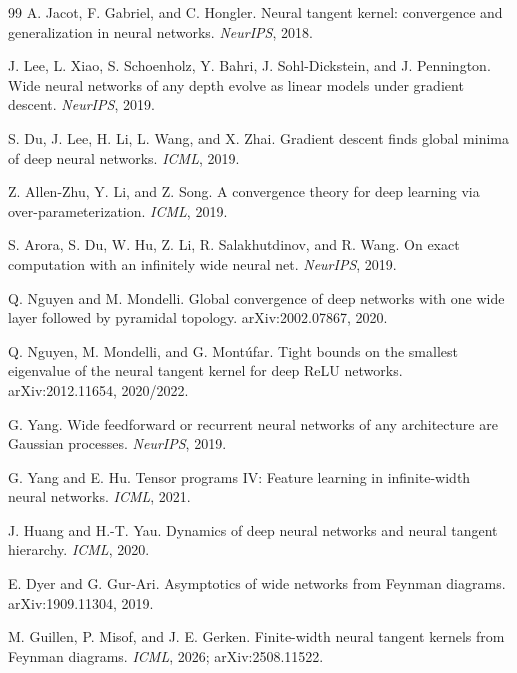 \documentclass{article}
\begin{document}
\begin{thebibliography}{99}
A. Jacot, F. Gabriel, and C. Hongler.
\newblock Neural tangent kernel: convergence and generalization in neural networks.
\newblock \emph{NeurIPS}, 2018.

J. Lee, L. Xiao, S. Schoenholz, Y. Bahri, J. Sohl-Dickstein, and J. Pennington.
\newblock Wide neural networks of any depth evolve as linear models under gradient descent.
\newblock \emph{NeurIPS}, 2019.

S. Du, J. Lee, H. Li, L. Wang, and X. Zhai.
\newblock Gradient descent finds global minima of deep neural networks.
\newblock \emph{ICML}, 2019.

Z. Allen-Zhu, Y. Li, and Z. Song.
\newblock A convergence theory for deep learning via over-parameterization.
\newblock \emph{ICML}, 2019.

S. Arora, S. Du, W. Hu, Z. Li, R. Salakhutdinov, and R. Wang.
\newblock On exact computation with an infinitely wide neural net.
\newblock \emph{NeurIPS}, 2019.

Q. Nguyen and M. Mondelli.
\newblock Global convergence of deep networks with one wide layer followed by pyramidal topology.
\newblock arXiv:2002.07867, 2020.

Q. Nguyen, M. Mondelli, and G. Montúfar.
\newblock Tight bounds on the smallest eigenvalue of the neural tangent kernel for deep ReLU networks.
\newblock arXiv:2012.11654, 2020/2022.

G. Yang.
\newblock Wide feedforward or recurrent neural networks of any architecture are Gaussian processes.
\newblock \emph{NeurIPS}, 2019.

G. Yang and E. Hu.
\newblock Tensor programs IV: Feature learning in infinite-width neural networks.
\newblock \emph{ICML}, 2021.

J. Huang and H.-T. Yau.
\newblock Dynamics of deep neural networks and neural tangent hierarchy.
\newblock \emph{ICML}, 2020.

E. Dyer and G. Gur-Ari.
\newblock Asymptotics of wide networks from Feynman diagrams.
\newblock arXiv:1909.11304, 2019.

M. Guillen, P. Misof, and J. E. Gerken.
\newblock Finite-width neural tangent kernels from Feynman diagrams.
\newblock \emph{ICML}, 2026; arXiv:2508.11522.


\end{thebibliography}
\end{document}

